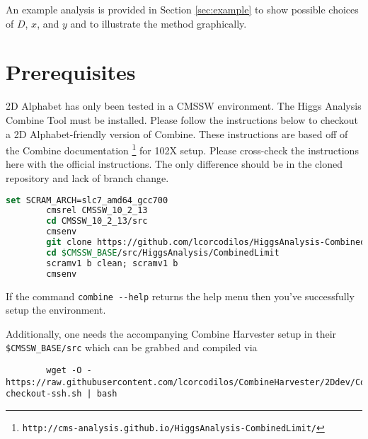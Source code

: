 \documentclass[letter]{article}
\begin{document}
    An example analysis is provided in Section \ref{sec:example} to show possible choices of $D$, $x$, and $y$ and to illustrate the method graphically.

\section{Prerequisites}
    2D Alphabet has only been tested in a CMSSW environment. The Higgs Analysis Combine Tool must be installed. Please follow the instructions below to checkout a 2D Alphabet-friendly version of Combine. These instructions are based off of the Combine documentation \footnote{\verb"http://cms-analysis.github.io/HiggsAnalysis-CombinedLimit/"} for 102X setup. Please cross-check the instructions here with the official instructions. The only difference should be in the cloned repository and lack of branch change.

    \begin{lstlisting}[language=csh]
        set SCRAM_ARCH=slc7_amd64_gcc700
        cmsrel CMSSW_10_2_13
        cd CMSSW_10_2_13/src
        cmsenv
        git clone https://github.com/lcorcodilos/HiggsAnalysis-CombinedLimit.git HiggsAnalysis/CombinedLimit
        cd $CMSSW_BASE/src/HiggsAnalysis/CombinedLimit
        scramv1 b clean; scramv1 b
        cmsenv
    \end{lstlisting}

    If the command \verb"combine --help" returns the help menu then you've successfully setup the environment.

    Additionally, one needs the accompanying Combine Harvester setup in their \verb"$CMSSW_BASE/src" which can be grabbed and compiled via 

    \begin{lstlisting}
        wget -O - https://raw.githubusercontent.com/lcorcodilos/CombineHarvester/2Ddev/CombineTools/scripts/sparse-checkout-ssh.sh | bash
    \end{lstlisting}

\end{document}

